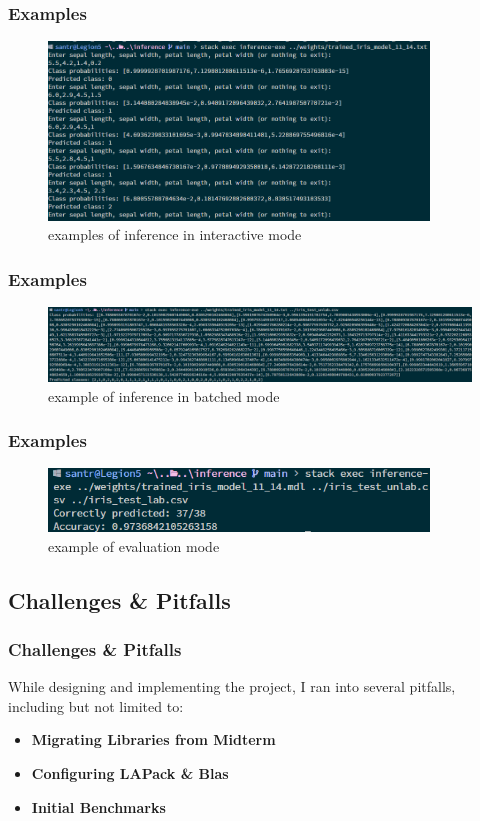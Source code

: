 \documentclass{beamer}
\begin{document}
\begin{frame}
  \frametitle{Examples}
  \begin{figure}
    \includegraphics[width=0.9\textwidth]{../images/examples.png}
    \caption{examples of inference in interactive mode}
  \end{figure}
\end{frame}

\begin{frame}
  \frametitle{Examples}
  \begin{figure}
    \includegraphics[width=\textwidth]{../images/examplebatch.png}
    \caption{example of inference in batched mode}
  \end{figure}
\end{frame}

\begin{frame}
  \frametitle{Examples}
  \begin{figure}
    \includegraphics[width=0.9\textwidth]{../images/exampleeval.png}
    \caption{example of evaluation mode}
  \end{figure}
\end{frame}

\subsection{Challenges \& Pitfalls}

\begin{frame}
  \frametitle{Challenges \& Pitfalls}

  While designing and implementing the project, I ran into several pitfalls, including but not limited to:
  \begin{itemize}
    \item \textbf{Migrating Libraries from Midterm}
    \item \textbf{Configuring LAPack \& Blas}
    \item \textbf{Initial Benchmarks}
  \end{itemize}
\end{frame}
\end{document}
